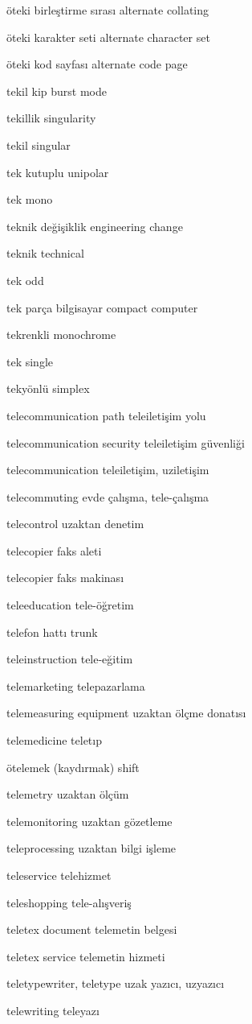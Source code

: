\documentclass[12pt,fleqn]{article}\usepackage{../../common}
\begin{document}
öteki birleştirme sırası alternate collating

öteki karakter seti alternate character set

öteki kod sayfası alternate code page

tekil kip burst mode

tekillik singularity

tekil singular

tek kutuplu unipolar

tek mono

teknik değişiklik engineering change

teknik technical

tek odd

tek parça bilgisayar compact computer

tekrenkli monochrome

tek single

tekyönlü simplex

telecommunication path teleiletişim yolu

telecommunication security teleiletişim güvenliği

telecommunication teleiletişim, uziletişim

telecommuting evde çalışma, tele-çalışma

telecontrol uzaktan denetim

telecopier faks aleti

telecopier faks makinası

teleeducation tele-öğretim

telefon hattı trunk

teleinstruction tele-eğitim

telemarketing telepazarlama

telemeasuring equipment uzaktan ölçme donatısı

telemedicine teletıp

ötelemek (kaydırmak) shift

telemetry uzaktan ölçüm

telemonitoring uzaktan gözetleme

teleprocessing uzaktan bilgi işleme

teleservice telehizmet

teleshopping tele-alışveriş

teletex document telemetin belgesi

teletex service telemetin hizmeti

teletypewriter, teletype uzak yazıcı, uzyazıcı

telewriting teleyazı
\end{document}
